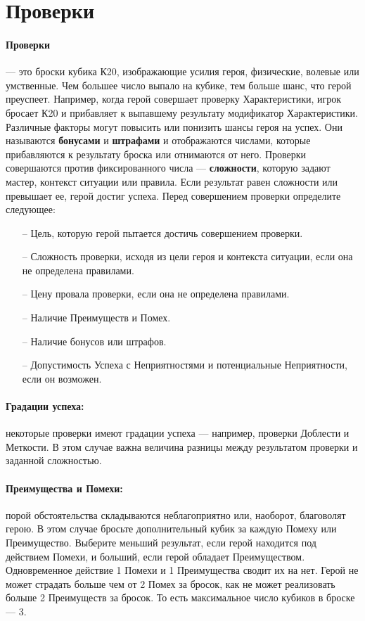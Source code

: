 \section{Проверки}
\paragraph{Проверки} — это броски кубика К20, изображающие усилия героя, физические, волевые или умственные. Чем большее число выпало на кубике, тем больше шанс, что герой преуспеет. Например, когда герой совершает проверку Характеристики, игрок бросает К20 и прибавляет к выпавшему результату модификатор Характеристики. Различные факторы могут повысить или понизить шансы героя на успех. Они называются \textbf{бонусами} и \textbf{штрафами} и отображаются числами, которые прибавляются к результату броска или отнимаются от него.
\newline Проверки совершаются против фиксированного числа — \textbf{сложности}, которую задают мастер, контекст ситуации или правила. Если результат равен сложности или превышает ее, герой достиг успеха.
\newline Перед совершением проверки определите следующее:
\begin{itemize}
\item[--]Цель, которую герой пытается достичь совершением проверки.
\item[--]Сложность проверки, исходя из цели героя и контекста
ситуации, если она не определена правилами.
\item[--]Цену провала проверки, если она не определена правилами.
\item[--]Наличие Преимуществ и Помех.
\item[--]Наличие бонусов или штрафов.
\item[--]Допустимость Успеха с Неприятностями и потенциальные Неприятности, если он возможен.
\end{itemize}
\paragraph{Градации успеха:} некоторые проверки имеют градации успеха — например, проверки Доблести и Меткости. В этом случае важна величина разницы между результатом проверки и заданной сложностью.
\paragraph{Преимущества и Помехи:} порой обстоятельства складываются неблагоприятно или, наоборот, благоволят герою. В этом случае бросьте дополнительный кубик за каждую Помеху или Преимущество. Выберите меньший результат, если герой находится под действием Помехи, и больший, если герой обладает Преимуществом. Одновременное действие 1 Помехи и 1 Преимущества сводит их на нет. 
\newline Герой не может страдать больше чем от 2 Помех за бросок, как не может реализовать больше 2 Преимуществ за бросок. То есть максимальное число кубиков в броске — 3.
